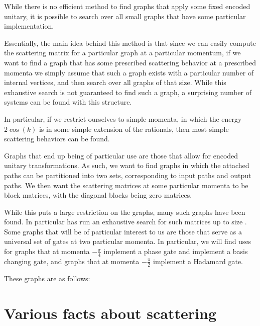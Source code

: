 \documentclass[../thesis-main/thesis-main]{subfiles}
\begin{document}
While there is no efficient method to find graphs that apply some fixed encoded unitary, it is possible to search over all small graphs that have some particular implementation.


Essentially, the main idea behind this method is that since we can easily compute the scattering matrix for a particular graph at a particular momentum, if we want to find a graph that has some prescribed scattering behavior at a prescribed momenta we simply assume that such a graph exists with a particular number of internal vertices, and then search over all graphs of that size.  While this exhaustive search is not guaranteed to find such a graph, a surprising number of systems can be found with this structure.  

In particular, if we restrict ourselves to simple momenta, in which the energy $2\cos(k)$ is in some simple extension of the rationals, then most simple scattering behaviors can be found.  

Graphs that end up being of particular use are those that allow for encoded unitary transformations.  As such, we want to find graphs in which the attached paths can be partitioned into two sets, corresponding to input paths and output paths.  We then want the scattering matrices at some particular momenta to be block matrices, with the diagonal blocks being zero matrices.

While this puts a large restriction on the graphs, many such graphs have been found.  In particular  has run an exhaustive search for such matrices up to size .  Some graphs that will be of particular interest to us are those that serve as a universal set of gates at two particular momenta.  In particular, we will find uses for graphs that at momenta $-\frac{\pi}{4}$ implement a phase gate and implement a basis changing gate, and graphs that at momenta $-\frac{\pi}{2}$ implement a Hadamard gate. 

These graphs are as follows:



\section{Various facts about scattering}
\end{document}
